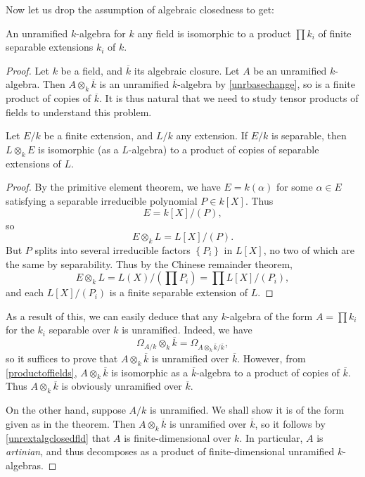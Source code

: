 Now let us drop the assumption of algebraic closedness to get:

\begin{theorem} \label{unrfield} 
An unramified $k$-algebra for $k$ any field is isomorphic to a product $\prod
k_i$ of finite separable extensions $k_i$ of $k$.
\end{theorem} 
\begin{proof} 
Let $k$ be a field, and $\overline{k}$ its algebraic closure. Let $A$ be an
unramified $k$-algebra. Then $A \otimes_k \overline{k}$ is an unramified
$\overline{k}$-algebra by \cref{unrbasechange}, so is a  finite product of copies of
$\overline{k}$.
It is thus natural that we need to study tensor products of fields to
understand this problem.

\begin{lemma} \label{productoffields}
Let $E/k$ be a finite extension, and $L/k$ any extension.
If $E/k$ is separable, then $L \otimes_k E$ is isomorphic (as a $L$-algebra) to a product of
copies of separable extensions of $L$.
\end{lemma} 
\begin{proof} 
By the primitive element theorem, we have $E = k(\alpha)$ for some $\alpha \in
E$ satisfying a separable irreducible polynomial $P \in k[X]$.
Thus 
\[ E = k[X]/(P),  \]
so
\[ E \otimes_k L = L[X]/(P).  \]
But $P$ splits into several irreducible factors $\left\{P_i\right\}$ in
$L[X]$, no two of which are the same by separability. 
Thus by the Chinese remainder theorem,
\[ E \otimes_k L = L(X)/(\prod P_i) = \prod L[X]/(P_i),  \]
and each $L[X]/(P_i)$ is a finite separable extension of $L$.
\end{proof} 

As a result of this, we can easily deduce that any $k$-algebra of the form
$A=\prod k_i$ for the $k_i$ separable over $k$ is unramified.
Indeed, we have
\[ \Omega_{A/k}\otimes_k \overline{k} = \Omega_{A \otimes_k
\overline{k}/\overline{k}}, \]
so it suffices to prove that $A \otimes_k \overline{k}$ is unramified over
$\overline{k}$. However, from \cref{productoffields}, $A \otimes_k
\overline{k}$ is isomorphic as a $\overline{k}$-algebra to a product of copies
of $\overline{k}$. Thus $A \otimes_k \overline{k}$ is obviously unramified
over $\overline{k}$.

On the other hand, suppose $A/k$ is unramified. We shall show it is of the
form given as in the theorem. Then $A \otimes_k
\overline{k}$ is unramified over $\overline{k}$, so it follows by
\cref{unrextalgclosedfld} that $A$ is finite-dimensional over $k$. In
particular, $A$ is \emph{artinian}, and thus decomposes as a product of
finite-dimensional unramified $k$-algebras.


\end{proof}
